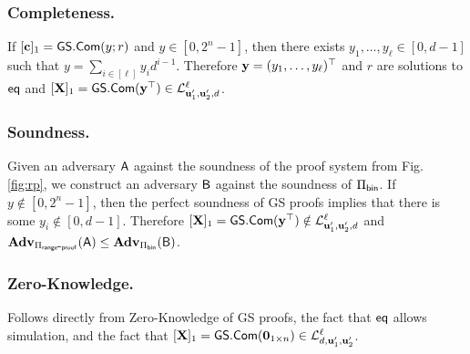 \subsubsection{Completeness.}
If $[\mathbf{c}]_1={\mathsf{GS}}.\mathsf{Com}(y;r)$ and $y\in[0,2^n-1]$, then there exists $y_1,\ldots,y_\ell\in[0,d-1]$  such that $y=\sum_{i\in[\ell]}y_id^{i-1}$. Therefore $\mathbf{y}=(y_1,\ldots,y_\ell)^\top$ and $r$ are solutions to $\mathsf{eq}$ and $[\mathbf{{X}}]_1={\mathsf{GS}}.\mathsf{Com}(\mathbf{y}^\top)\in\mathcal{L}_{\mathbf{u}'_1,\mathbf{u}'_2,d}^\ell$.

\subsubsection{Soundness.}
Given an adversary $\mathsf{A}$ against the soundness of the proof system from Fig. \ref{fig:rp}, we construct an adversary $\mathsf{B}$ against the soundness of $\Pi_{\mathsf{bin}}$. If $y\notin[0,2^n-1]$, then the perfect soundness of GS proofs implies that there is some $y_i\notin[0,d-1]$. Therefore $[\mathbf{{X}}]_1={\mathsf{GS}}.\mathsf{Com}(\mathbf{y}^\top)\notin\mathcal{L}_{\mathbf{u}'_1,\mathbf{u}'_2,d}^\ell$ and $\mathbf{Adv}_{\Pi_{\mathsf{range}\mbox{-}\mathsf{proof}}}(\mathsf{A})\leq\mathbf{Adv}_{\Pi_{\mathsf{bin}}}(\mathsf{B})$.

\subsubsection{Zero-Knowledge.} Follows directly from Zero-Knowledge of GS proofs, the fact that $\mathsf{eq}$ allows simulation, and the fact that $[\mathbf{{X}}]_1={\mathsf{GS}}.\mathsf{Com}(\mathbf{{0}}_{1\times n})\in\mathcal{L}_{d,\mathbf{u}'_1,\mathbf{u}'_2}^\ell$.
